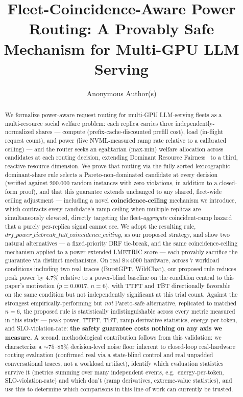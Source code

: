 \documentclass[sigconf,review,anonymous]{acmart}
\begin{document}
\title{Fleet-Coincidence-Aware Power Routing: A Provably Safe Mechanism for Multi-GPU LLM Serving}

\author{Anonymous Author(s)}

\begin{abstract}
We formalize power-aware request routing for multi-GPU LLM-serving fleets as a
multi-resource social welfare problem: each replica carries three independently-normalized
shares --- compute (prefix-cache-discounted prefill cost), load (in-flight request count),
and power (live NVML-measured ramp rate relative to a calibrated ceiling) --- and the router
seeks an egalitarian (max-min) welfare allocation across candidates at each routing decision,
extending Dominant Resource Fairness~\cite{ghodsi2011drf} to a third, reactive resource
dimension. We prove that routing via the fully-sorted lexicographic dominant-share rule
selects a Pareto-non-dominated candidate at every decision (verified against 200{,}000 random
instances with zero violations, in addition to a closed-form proof), and that this guarantee
extends unchanged to any shared, fleet-wide ceiling adjustment --- including a novel
\textbf{coincidence-ceiling} mechanism we introduce, which contracts every candidate's ramp
ceiling when multiple replicas are simultaneously elevated, directly targeting the
fleet-\emph{aggregate} coincident-ramp hazard that a purely per-replica signal cannot see. We
adopt the resulting rule, $\mathit{drf\_power\_tiebreak\_full\_coincidence\_ceiling}$, as our
proposed strategy, and show two natural alternatives --- a fixed-priority DRF tie-break, and
the same coincidence-ceiling mechanism applied to a power-extended LMETRIC score --- each
provably sacrifice the guarantee via distinct mechanisms. On real 8$\times$4090 hardware,
across 7 workload conditions including two real traces (BurstGPT, WildChat), our proposed
rule reduces peak power by 4.7\% relative to a power-blind baseline on the condition central
to this paper's motivation ($p{=}0.0017$, $n{=}6$), with TTFT and TBT directionally favorable
on the same condition but not independently significant at this trial count. Against the
strongest empirically-performing but \emph{not} Pareto-safe alternative, replicated to matched
$n{=}6$, the proposed rule is statistically indistinguishable across every metric measured in
this study --- peak power, TTFT, TBT, ramp-derivative statistics, energy-per-token, and
SLO-violation-rate: \textbf{the safety guarantee costs nothing on any axis we measure.} A
second, methodological contribution follows from this validation: we characterize a
${\sim}75$--85\% decision-level noise floor inherent to closed-loop real-hardware routing
evaluation (confirmed real via a state-blind control and real unpadded conversational traces,
not a workload artifact), identify which evaluation statistics survive it (metrics summing
over many independent events, e.g.\ energy-per-token, SLO-violation-rate) and which don't
(ramp derivatives, extreme-value statistics), and use this to determine which comparisons in
this line of work can currently be trusted.
\end{abstract}
\end{document}

